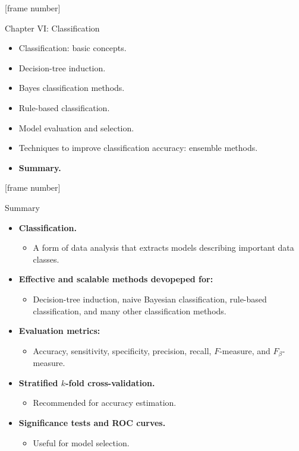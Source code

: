 \documentclass[aspectratio=169,t,table]{beamer}
\begin{document}
  {
    [frame number]
    \begin{frame}{Chapter VI: Classification}
        \begin{itemize}
            \item Classification: basic concepts.
            \item Decision-tree induction.
            \item Bayes classification methods.
            \item Rule-based classification.
            \item Model evaluation and selection.
            \item Techniques to improve classification accuracy: ensemble methods.
            \item \textbf{Summary.}
        \end{itemize}
    \end{frame}
  }

  {
    [frame number]
    \begin{frame}{Summary}
        \begin{itemize}
          \item \textbf{Classification.}
          \begin{itemize}
            \item A form of data analysis that extracts models describing important data classes.
          \end{itemize}
          \item \textbf{Effective and scalable methods devopeped for:}
          \begin{itemize}
            \item Decision-tree induction, naive Bayesian classification, rule-based classification, and many other classification methods.
          \end{itemize}
          \item \textbf{Evaluation metrics:}
          \begin{itemize}
            \item Accuracy, sensitivity, specificity, precision, recall, $F$-measure, and $F_\beta$-measure.
          \end{itemize}
          \item \textbf{Stratified $k$-fold cross-validation.}
          \begin{itemize}
            \item Recommended for accuracy estimation.
          \end{itemize}
          \item \textbf{Significance tests and ROC curves.}
          \begin{itemize}
            \item Useful for model selection.
          \end{itemize}
        \end{itemize}
    \end{frame}
  }
\end{document}
